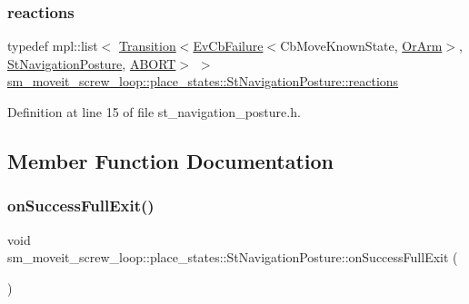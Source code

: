 \subsubsection{\texorpdfstring{reactions}{reactions}}
{\footnotesize\ttfamily typedef mpl\+::list$<$ \hyperlink{classsmacc_1_1Transition}{Transition}$<$\hyperlink{structsmacc_1_1EvCbFailure}{Ev\+Cb\+Failure}$<$Cb\+Move\+Known\+State, \hyperlink{classsm__moveit__screw__loop_1_1OrArm}{Or\+Arm}$>$, \hyperlink{structsm__moveit__screw__loop_1_1place__states_1_1StNavigationPosture}{St\+Navigation\+Posture}, \hyperlink{structsmacc_1_1default__transition__tags_1_1ABORT}{A\+B\+O\+RT}$>$ $>$ \hyperlink{structsm__moveit__screw__loop_1_1place__states_1_1StNavigationPosture_a48e9b1c89bd8579e8adad0e218794b04}{sm\+\_\+moveit\+\_\+screw\+\_\+loop\+::place\+\_\+states\+::\+St\+Navigation\+Posture\+::reactions}}



Definition at line 15 of file st\+\_\+navigation\+\_\+posture.\+h.



\subsection{Member Function Documentation}
\mbox{\label{structsm__moveit__screw__loop_1_1place__states_1_1StNavigationPosture_a8d05eb1ba1269dae6030e73ba8240109}} 
\subsubsection{\texorpdfstring{on\+Success\+Full\+Exit()}{onSuccessFullExit()}}
{\footnotesize\ttfamily void sm\+\_\+moveit\+\_\+screw\+\_\+loop\+::place\+\_\+states\+::\+St\+Navigation\+Posture\+::on\+Success\+Full\+Exit (\begin{DoxyParamCaption}{ }\end{DoxyParamCaption})\hspace{0.3cm}{\ttfamily [inline]}}



